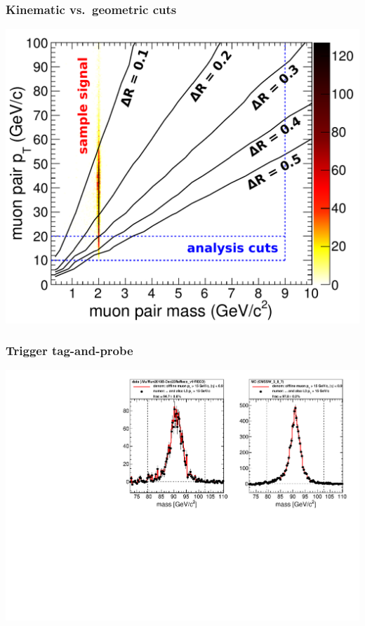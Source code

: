 \documentclass[compress]{beamer}
\begin{document}
\begin{frame}
\frametitle{Kinematic vs.\ geometric cuts}
\begin{center}
\includegraphics[width=0.9\linewidth]{openingangle_with_signal.pdf}
\end{center}
\end{frame}

\begin{frame}
\frametitle{Trigger tag-and-probe}

\includegraphics[width=\linewidth]{trigeff_endcapbarrel_0968.pdf}
\end{frame}
\end{document}
